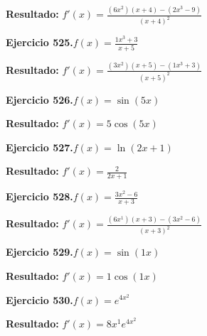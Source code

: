 \documentclass[10pt,a4paper]{article}
\begin{document}
\begin{solbox}
\textbf{Resultado:} \(\displaystyle f'(x) = \frac{(6x^{2})(x+4) - (2x^{3} -9)}{(x+4)^2}\)
\end{solbox}

\begin{ejbox}
\textbf{Ejercicio 525.}\quad $f(x) = \frac{1x^{3} +3}{x + 5}$
\end{ejbox}

\begin{solbox}
\textbf{Resultado:} \(\displaystyle f'(x) = \frac{(3x^{2})(x+5) - (1x^{3} +3)}{(x+5)^2}\)
\end{solbox}

\newpage
\begin{ejbox}
\textbf{Ejercicio 526.}\quad $f(x) = \sin(5x)$
\end{ejbox}

\begin{solbox}
\textbf{Resultado:} \(\displaystyle f'(x) = 5\cos(5x)\)
\end{solbox}

\begin{ejbox}
\textbf{Ejercicio 527.}\quad $f(x) = \ln(2x + 1)$
\end{ejbox}

\begin{solbox}
\textbf{Resultado:} \(\displaystyle f'(x) = \frac{2}{2x + 1}\)
\end{solbox}

\begin{ejbox}
\textbf{Ejercicio 528.}\quad $f(x) = \frac{3x^{2} -6}{x + 3}$
\end{ejbox}

\begin{solbox}
\textbf{Resultado:} \(\displaystyle f'(x) = \frac{(6x^{1})(x+3) - (3x^{2} -6)}{(x+3)^2}\)
\end{solbox}

\newpage
\begin{ejbox}
\textbf{Ejercicio 529.}\quad $f(x) = \sin(1x)$
\end{ejbox}

\begin{solbox}
\textbf{Resultado:} \(\displaystyle f'(x) = 1\cos(1x)\)
\end{solbox}

\begin{ejbox}
\textbf{Ejercicio 530.}\quad $f(x) = e^{4x^{2}}$
\end{ejbox}

\begin{solbox}
\textbf{Resultado:} \(\displaystyle f'(x) = 8x^{1}e^{4x^{2}}\)
\end{solbox}
\end{document}

